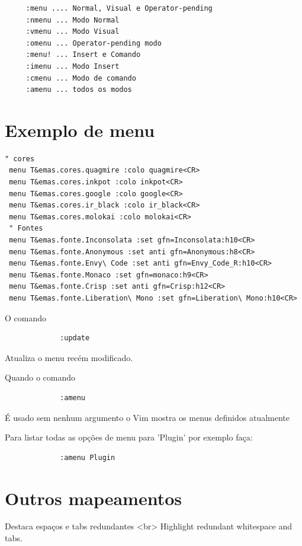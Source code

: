\documentclass[10pt,a4paper,openany]{book}
\begin{document}
\begin{verbatim}
	 :menu .... Normal, Visual e Operator-pending
	 :nmenu ... Modo Normal
	 :vmenu ... Modo Visual
	 :omenu ... Operator-pending modo
	 :menu! ... Insert e Comando
	 :imenu ... Modo Insert
	 :cmenu ... Modo de comando
	 :amenu ... todos os modos
\end{verbatim}

\section{Exemplo de menu}
\label{Exemplo de menu}

\begin{verbatim}
" cores
 menu T&emas.cores.quagmire :colo quagmire<CR>
 menu T&emas.cores.inkpot :colo inkpot<CR>
 menu T&emas.cores.google :colo google<CR>
 menu T&emas.cores.ir_black :colo ir_black<CR>
 menu T&emas.cores.molokai :colo molokai<CR>
 " Fontes
 menu T&emas.fonte.Inconsolata :set gfn=Inconsolata:h10<CR>
 menu T&emas.fonte.Anonymous :set anti gfn=Anonymous:h8<CR>
 menu T&emas.fonte.Envy\ Code :set anti gfn=Envy_Code_R:h10<CR>
 menu T&emas.fonte.Monaco :set gfn=monaco:h9<CR>
 menu T&emas.fonte.Crisp :set anti gfn=Crisp:h12<CR>
 menu T&emas.fonte.Liberation\ Mono :set gfn=Liberation\ Mono:h10<CR>
\end{verbatim}

O comando

\begin{verbatim}
			 :update
\end{verbatim}

Atualiza o menu recém modificado.

Quando o comando

\begin{verbatim}
			 :amenu
\end{verbatim}

É usado sem nenhum argumento o Vim mostra os menus definidos atualmente

Para listar todas as opções de menu para 'Plugin' por exemplo faça:

\begin{verbatim}
			 :amenu Plugin
\end{verbatim}

\section{Outros mapeamentos}
\label{Outros mapeamentos}

Destaca espaços e tabs redundantes <br>
Highlight redundant whitespace and tabs.
\end{document}
